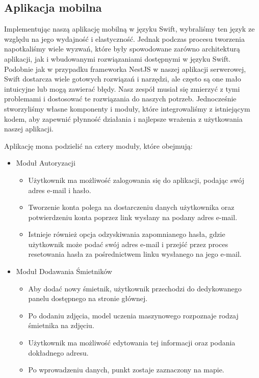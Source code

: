 \documentclass[12pt, a4paper, twoside, openany]{book}
\newcommand{\forceindent}{\leavevmode{\parindent=1.3em\indent}}
\begin{document}
\subsection{Aplikacja mobilna}

\forceindent Implementując naszą aplikację mobilną w języku Swift, wybraliśmy ten język ze względu na jego wydajność i elastyczność. Jednak podczas procesu tworzenia napotkaliśmy wiele wyzwań, które były spowodowane zarówno architekturą aplikacji, jak i wbudowanymi rozwiązaniami dostępnymi w języku Swift. Podobnie jak w przypadku frameworka NestJS w naszej aplikacji serwerowej, Swift dostarcza wiele gotowych rozwiązań i narzędzi, ale często są one mało intuicyjne lub mogą zawierać błędy. Nasz zespół musiał się zmierzyć z tymi problemami i dostosować te rozwiązania do naszych potrzeb. Jednocześnie stworzyliśmy własne komponenty i moduły, które integrowaliśmy z istniejącym kodem, aby zapewnić płynność działania i najlepsze wrażenia z użytkowania naszej aplikacji.

Aplikację mona podzielić na cztery moduły, które obejmują:

\begin{itemize}
    \item Moduł Autoryzacji
        \begin{itemize}
            \item Użytkownik ma możliwość zalogowania się do aplikacji, podając swój adres e-mail i hasło.
            \item Tworzenie konta polega na dostarczeniu danych użytkownika oraz potwierdzeniu konta poprzez link wysłany na podany adres e-mail.
            \item Istnieje również opcja odzyskiwania zapomnianego hasła, gdzie użytkownik może podać swój adres e-mail i przejść przez proces resetowania hasła za pośrednictwem linku wysłanego na jego e-mail.
        \end{itemize}
\end{itemize}

\begin{itemize}
    \item Moduł Dodawania Śmietników
        \begin{itemize}
            \item Aby dodać nowy śmietnik, użytkownik przechodzi do dedykowanego panelu dostępnego na stronie głównej.
            \item Po dodaniu zdjęcia, model uczenia maszynowego rozpoznaje rodzaj śmietnika na zdjęciu.
            \item Użytkownik ma możliwość edytowania tej informacji oraz podania dokładnego adresu.
            \item Po wprowadzeniu danych, punkt zostaje zaznaczony na mapie.
        \end{itemize}
\end{itemize}
\end{document}
